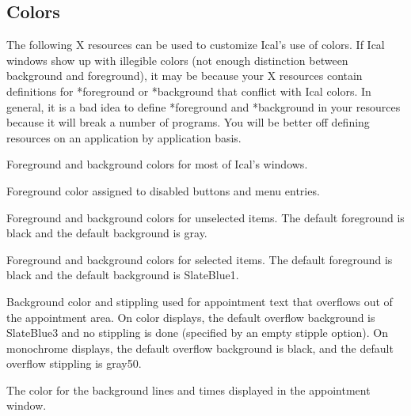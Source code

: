 \documentclass[a4paper,english]{article}
\begin{document}
    \subsection{Colors}
        \begin{Description}\setlength{\itemsep}{0cm}
        The following X resources can be used to customize Ical's use
        of colors.  If Ical windows show up with illegible colors (not
        enough distinction between background and foreground), it may
        be because your X resources contain definitions for
        *foreground or *background that conflict with Ical colors.  In
        general, it is a bad idea to define *foreground and
        *background in your resources because it will break a number
        of programs.  You will be better off defining resources on an
        application by application basis.

        \item[Ical*Foreground/Ical*Background]
            Foreground and background colors for most of Ical's
            windows.

        \item[Ical*disabledForeground]
            Foreground color assigned to disabled buttons and menu
            entries.

        \item[Ical.itemFg/Ical.itemBg]
            Foreground and background colors for unselected items.
            The default foreground is black and the default background
            is gray.

        \item[Ical.itemSelectFg/Ical.itemSelectBg]
            Foreground and background colors for selected items.  The
            default foreground is black and the default background is
            SlateBlue1.

        \item[Ical.itemOverflowColor/Ical.itemOverflowStipple]
            Background color and stippling used for appointment text
            that overflows out of the appointment area.  On color
            displays, the default overflow background is SlateBlue3
            and no stippling is done (specified by an empty stipple
            option).  On monochrome displays, the default overflow
            background is black, and the default overflow stippling is
            gray50.

        \item[Ical.apptLineColor]
            The color for the background lines and times displayed in
            the appointment window.


\end{Description}
\end{document}
